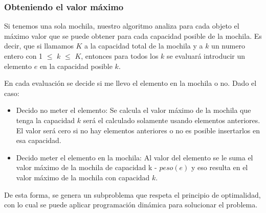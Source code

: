 \subsubsection*{Obteniendo el valor máximo}

Si tenemos una sola mochila, nuestro algoritmo analiza para cada objeto el máximo valor que se puede obtener para cada capacidad posible de la mochila. Es decir, que si llamamos $K$ a la capacidad total de la mochila y a $k$ un numero entero con 1 $\leq$ $k$ $\leq$ $K$, entonces para todos los $k$ se evaluará introducir un elemento $e$ en la capacidad posible $k$.



En cada evaluación se decide si me llevo el elemento en la mochila o no. Dado el caso:

\begin{itemize}
	\item Decido no meter el elemento: Se calcula el valor máximo de la mochila que tenga la capacidad $k$ será el calculado solamente usando elementos anteriores. El valor será cero si no hay elementos anteriores o no es posible insertarlos en esa capacidad.
	\item Decido meter el elemento en la mochila: Al valor del elemento se le suma el valor máximo de la mochila de capacidad k - $peso(e)$ y eso resulta en el valor máximo de la mochila con capacidad $k$.
\end{itemize} 

 De esta forma, se genera un subproblema que respeta el principio de optimalidad, con lo cual se puede aplicar programación dinámica para solucionar el problema. \\ 
 
